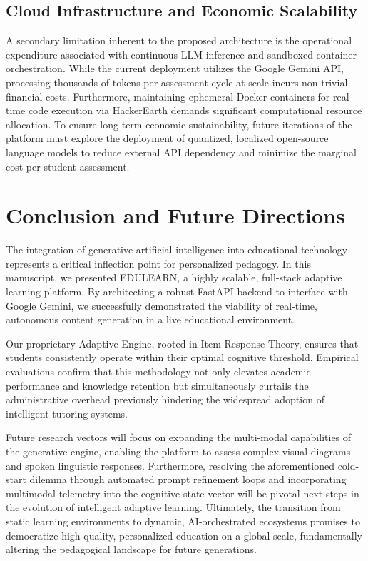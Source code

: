 \documentclass[conference]{IEEEtran}
\begin{document}
\subsection{Cloud Infrastructure and Economic Scalability}
A secondary limitation inherent to the proposed architecture is the operational expenditure associated with continuous LLM inference and sandboxed container orchestration. While the current deployment utilizes the Google Gemini API, processing thousands of tokens per assessment cycle at scale incurs non-trivial financial costs. Furthermore, maintaining ephemeral Docker containers for real-time code execution via HackerEarth demands significant computational resource allocation. To ensure long-term economic sustainability, future iterations of the platform must explore the deployment of quantized, localized open-source language models to reduce external API dependency and minimize the marginal cost per student assessment.

\section{Conclusion and Future Directions}
The integration of generative artificial intelligence into educational technology represents a critical inflection point for personalized pedagogy. In this manuscript, we presented EDULEARN, a highly scalable, full-stack adaptive learning platform. By architecting a robust FastAPI backend to interface with Google Gemini, we successfully demonstrated the viability of real-time, autonomous content generation in a live educational environment.

Our proprietary Adaptive Engine, rooted in Item Response Theory, ensures that students consistently operate within their optimal cognitive threshold. Empirical evaluations confirm that this methodology not only elevates academic performance and knowledge retention but simultaneously curtails the administrative overhead previously hindering the widespread adoption of intelligent tutoring systems. 

Future research vectors will focus on expanding the multi-modal capabilities of the generative engine, enabling the platform to assess complex visual diagrams and spoken linguistic responses. Furthermore, resolving the aforementioned cold-start dilemma through automated prompt refinement loops and incorporating multimodal telemetry into the cognitive state vector will be pivotal next steps in the evolution of intelligent adaptive learning. Ultimately, the transition from static learning environments to dynamic, AI-orchestrated ecosystems promises to democratize high-quality, personalized education on a global scale, fundamentally altering the pedagogical landscape for future generations.
\end{document}
